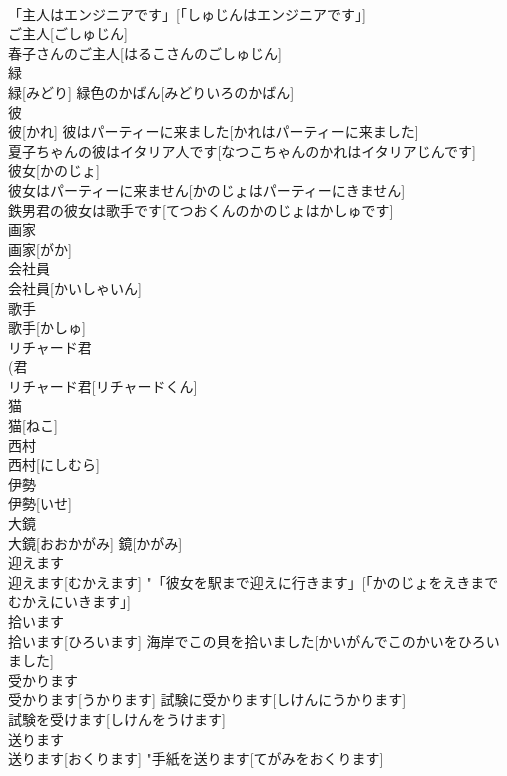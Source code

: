 \documentclass[8pt]{extreport}
\begin{document}
\begin{CJK}{UTF8}{min}
\\	「主人はエンジニアです」[「しゅじんはエンジニアです」] 
\\	ご主人[ごしゅじん] 
\\	春子さんのご主人[はるこさんのごしゅじん] 
\\	緑	
\\	緑[みどり]	緑色のかばん[みどりいろのかばん] 
\\	彼	
\\	彼[かれ]	彼はパーティーに来ました[かれはパーティーに来ました] 
\\	夏子ちゃんの彼はイタリア人です[なつこちゃんのかれはイタリアじんです] 
\\	彼女[かのじょ] 
\\	彼女はパーティーに来ません[かのじょはパーティーにきません] 
\\	鉄男君の彼女は歌手です[てつおくんのかのじょはかしゅです] 
\\	画家	
\\	画家[がか]	
\\	会社員	
\\	会社員[かいしゃいん]	
\\	歌手	
\\	歌手[かしゅ]	
\\	リチャード君	
\\	(君 
\\	リチャード君[リチャードくん]	
\\	猫	
\\	猫[ねこ]	
\\	西村	
\\	西村[にしむら]	
\\	伊勢	
\\	伊勢[いせ]	
\\	大鏡	
\\	大鏡[おおかがみ]	鏡[かがみ] 
\\	迎えます	
\\	迎えます[むかえます]	"「彼女を駅まで迎えに行きます」[「かのじょをえきまでむかえにいきます」] 
\\	拾います	
\\	拾います[ひろいます]	海岸でこの貝を拾いました[かいがんでこのかいをひろいました] 
\\	受かります	
\\	受かります[うかります]	試験に受かります[しけんにうかります] 
\\	試験を受けます[しけんをうけます] 
\\	送ります	
\\	送ります[おくります]	"手紙を送ります[てがみをおくります] 

\end{CJK}
\end{document}

